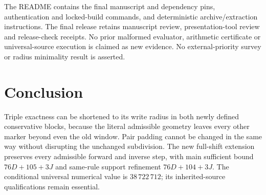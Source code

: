 \documentclass[11pt,a4paper]{article}
\newcommand{\fpaheadL}{Five-particle binary automata}
\newcommand{\fpaheadR}{Front matter}
\numberwithin{equation}{section}
\begin{document}
The README contains the final manuscript and dependency pins, authentication and locked-build commands, and deterministic archive/extraction instructions. The final release retains manuscript review, presentation-tool review and release-check receipts. No prior malformed evaluator, arithmetic certificate or universal-source execution is claimed as new evidence. No external-priority survey or radius minimality result is asserted.

\section{Conclusion}\label{fpa:rep:71:last}
Triple exactness can be shortened to its write radius in both newly defined conservative blocks, because the literal admissible geometry leaves every other marker beyond even the old window. Pair padding cannot be changed in the same way without disrupting the unchanged subdivision. The new full-shift extension preserves every admissible forward and inverse step, with main sufficient bound $76D+105+3J$ and same-rule support refinement $76D+104+3J$. The conditional universal numerical value is $38\,722\,712$; its inherited-source qualifications remain essential.


\renewcommand{\fpaheadL}{Five-particle binary automata}\renewcommand{\fpaheadR}{Part VII}
\end{document}

